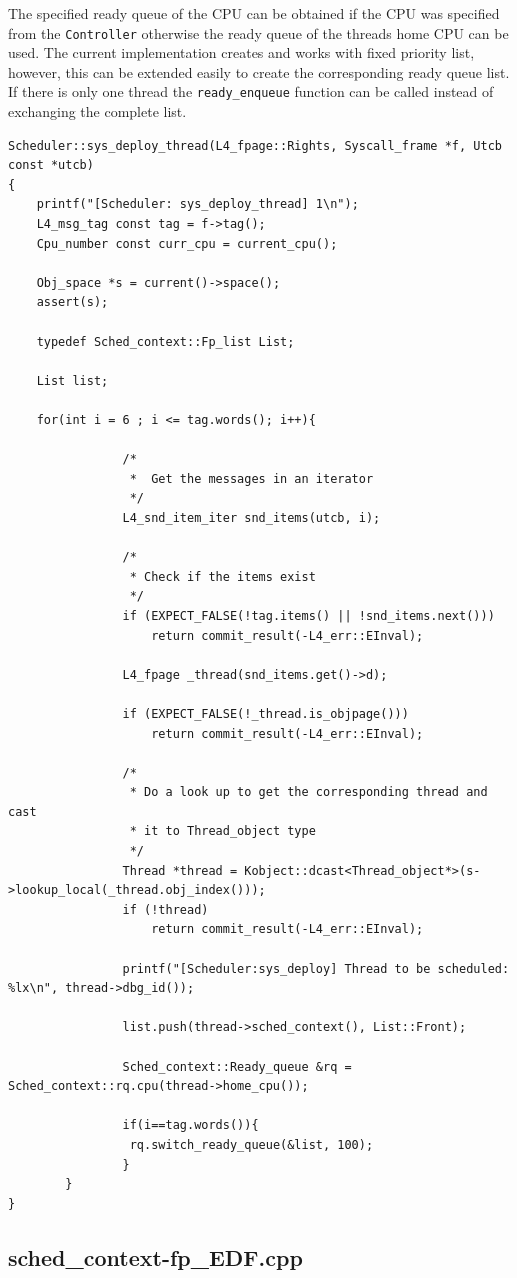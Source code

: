 The specified ready queue of the CPU can be obtained if the CPU was specified from the \texttt{Controller} otherwise the ready queue of the threads home CPU can be used. The current implementation creates and works with fixed priority list, however, this can be extended easily to create the corresponding ready queue list. If there is only one thread the \texttt{ready\_enqueue} function can be called instead of exchanging the complete list.


\begin{lstlisting}[caption={Thread extraction and ready list creation},label=sysdeploycode, style=customcpp]
Scheduler::sys_deploy_thread(L4_fpage::Rights, Syscall_frame *f, Utcb const *utcb)
{
	printf("[Scheduler: sys_deploy_thread] 1\n");
	L4_msg_tag const tag = f->tag();
	Cpu_number const curr_cpu = current_cpu();

	Obj_space *s = current()->space();
	assert(s);

	typedef Sched_context::Fp_list List;

	List list;
	
	for(int i = 6 ; i <= tag.words(); i++){
				
				/*
				 *	Get the messages in an iterator
				 */
				L4_snd_item_iter snd_items(utcb, i);

				/*
				 * Check if the items exist
				 */
				if (EXPECT_FALSE(!tag.items() || !snd_items.next()))
					return commit_result(-L4_err::EInval);

				L4_fpage _thread(snd_items.get()->d);

				if (EXPECT_FALSE(!_thread.is_objpage()))
					return commit_result(-L4_err::EInval);

				/*
				 * Do a look up to get the corresponding thread and cast 
				 * it to Thread_object type
				 */
				Thread *thread = Kobject::dcast<Thread_object*>(s->lookup_local(_thread.obj_index()));
				if (!thread)
					return commit_result(-L4_err::EInval);

				printf("[Scheduler:sys_deploy] Thread to be scheduled: %lx\n", thread->dbg_id());

				list.push(thread->sched_context(), List::Front);

				Sched_context::Ready_queue &rq = Sched_context::rq.cpu(thread->home_cpu());

				if(i==tag.words()){
				 rq.switch_ready_queue(&list, 100);
				}
		}
}
\end{lstlisting}

\subsection{sched\_context-fp\_EDF.cpp}


